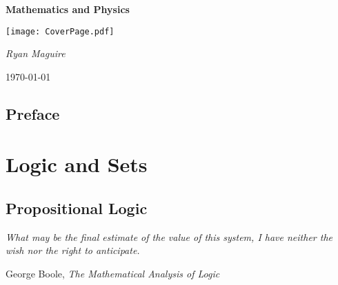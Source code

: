 \documentclass{book}                                                           %
\begin{document}
    \pagecolor{CoverPage}
    \begin{titlepage}
        \centering
        \LARGE{\bfseries{Mathematics and Physics}}
        \par\vspace{3.5cm}
        \texttt{[image: CoverPage.pdf]}
        \par\vspace{4cm}
        \Large{\itshape{Ryan Maguire}}
        \par\vspace{1.5ex}
        \normalsize{\today}
    \end{titlepage}
    \nopagecolor
    \tableofcontents
    \listoffigures
    \listoftables
    \clearpage
    \chapter*{Preface}
        
    \clearpage
    \clearpage
        \renewcommand{\bookPath}{foundations}
        \label{book:foundations}%
        \renewcommand{\partPath}{\bookPath/logic_and_sets}
        \part{Logic and Sets}
            \chapter{Propositional Logic}
                \hfill
                \begin{minipage}[b]{0.7\textwidth}
                    \itshape
                    What may be the final estimate of the value of this
                    system, I have neither the wish nor the right to
                    anticipate.
                    \par\hfill\par
                    \hfill
                    \normalfont
                    George Boole,
                    \itshape
                    The Mathematical Analysis of Logic
                \end{minipage}
                \par\hfill\par
                \renewcommand{\chapterPath}{\partPath/propositional_logic}
                \label{chapt:Propositional_Logic}%
                
                
\end{document}
